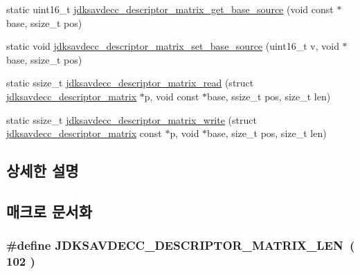 \begin{DoxyCompactItemize}
static uint16\+\_\+t \hyperlink{group__descriptor__matrix_gacc8325d51ddfdccfcc1c3db996ace28c}{jdksavdecc\+\_\+descriptor\+\_\+matrix\+\_\+get\+\_\+base\+\_\+source} (void const $\ast$base, ssize\+\_\+t pos)
\item 
static void \hyperlink{group__descriptor__matrix_gaa9d80d41ea9e5452a7150e77ba16a448}{jdksavdecc\+\_\+descriptor\+\_\+matrix\+\_\+set\+\_\+base\+\_\+source} (uint16\+\_\+t v, void $\ast$base, ssize\+\_\+t pos)
\item 
static ssize\+\_\+t \hyperlink{group__descriptor__matrix_gaaf8ef4937e8bc8741857df9c06d2e75b}{jdksavdecc\+\_\+descriptor\+\_\+matrix\+\_\+read} (struct \hyperlink{structjdksavdecc__descriptor__matrix}{jdksavdecc\+\_\+descriptor\+\_\+matrix} $\ast$p, void const $\ast$base, ssize\+\_\+t pos, size\+\_\+t len)
\item 
static ssize\+\_\+t \hyperlink{group__descriptor__matrix_ga8388b6f549fd0b381bc081e641bd4e5e}{jdksavdecc\+\_\+descriptor\+\_\+matrix\+\_\+write} (struct \hyperlink{structjdksavdecc__descriptor__matrix}{jdksavdecc\+\_\+descriptor\+\_\+matrix} const $\ast$p, void $\ast$base, size\+\_\+t pos, size\+\_\+t len)
\end{DoxyCompactItemize}


\subsection{상세한 설명}


\subsection{매크로 문서화}
\subsubsection[{\texorpdfstring{J\+D\+K\+S\+A\+V\+D\+E\+C\+C\+\_\+\+D\+E\+S\+C\+R\+I\+P\+T\+O\+R\+\_\+\+M\+A\+T\+R\+I\+X\+\_\+\+L\+EN}{JDKSAVDECC_DESCRIPTOR_MATRIX_LEN}}]{\setlength{\rightskip}{0pt plus 5cm}\#define J\+D\+K\+S\+A\+V\+D\+E\+C\+C\+\_\+\+D\+E\+S\+C\+R\+I\+P\+T\+O\+R\+\_\+\+M\+A\+T\+R\+I\+X\+\_\+\+L\+EN~( 102 )}\hypertarget{group__descriptor__matrix_ga28ec282c7b2cb6dc955976b0727a616e}{}\label{group__descriptor__matrix_ga28ec282c7b2cb6dc955976b0727a616e}


